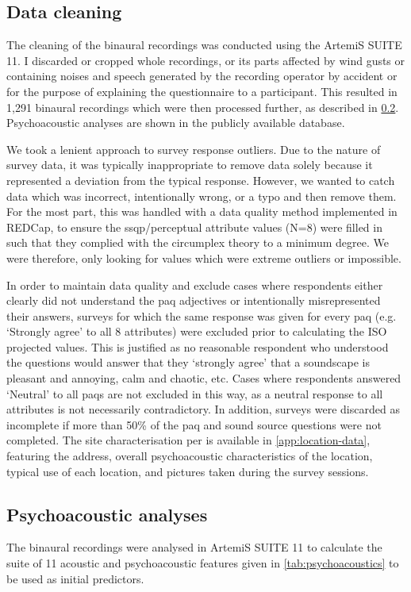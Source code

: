 \subsection{Data cleaning}

The cleaning of the binaural recordings was conducted using the ArtemiS SUITE 11. I discarded or cropped whole recordings, or its parts affected by wind gusts or containing noises and speech generated by the recording operator by accident or for the purpose of explaining the questionnaire to a participant. This resulted in 1,291 binaural recordings which were then processed further, as described in \cref{sec:analyses}. Psychoacoustic analyses are shown in the publicly available database.

We took a lenient approach to survey response outliers. Due to the nature of survey data, it was typically inappropriate to remove data solely because it represented a deviation from the typical response. However, we wanted to catch data which was incorrect, intentionally wrong, or a typo and then remove them. For the most part, this was handled with a data quality method implemented in REDCap, to ensure the \gls{ssqp}/perceptual attribute values (N=8) were filled in such that they complied with the circumplex theory to a minimum degree. We were therefore, only looking for values which were extreme outliers or impossible.

In order to maintain data quality and exclude cases where respondents either clearly did not understand the \gls{paq} adjectives or intentionally misrepresented their answers, surveys for which the same response was given for every \gls{paq} (e.g. `Strongly agree' to all 8 attributes) were excluded prior to calculating the ISO projected values. This is justified as no reasonable respondent who understood the questions would answer that they `strongly agree' that a soundscape is pleasant and annoying, calm and chaotic, etc. Cases where respondents answered `Neutral' to all \glspl{paq} are not excluded in this way, as a neutral response to all attributes is not necessarily contradictory. In addition, surveys were discarded as incomplete if more than 50\% of the \gls{paq} and sound source questions were not completed. The site characterisation per \citet{ISO12913Part2} is available in \cref{app:location-data}, featuring the address, overall psychoacoustic characteristics of the location, typical use of each location, and pictures taken during the survey sessions.

\subsection{Psychoacoustic analyses}
   \label{sec:analyses}
   The binaural recordings were analysed in ArtemiS SUITE 11 to calculate the suite of 11 acoustic and psychoacoustic features given in \cref{tab:psychoacoustics} to be used as initial predictors.

